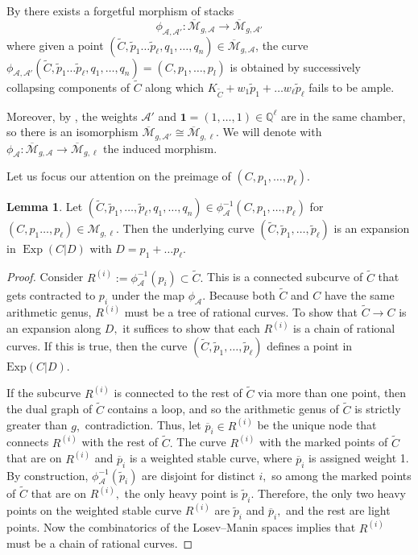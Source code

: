 \documentclass[10.5pt]{amsart}
\theoremstyle{definition}
\theoremstyle{definition}
\theoremstyle{definition}
\theoremstyle{definition}
\newtheorem{lemma}[theorem]{Lemma}
\newcommand{\Exp}{\operatorname{Exp}}
\newcommand{\ol}[1]{\overline{#1}}
\newcommand{\Mcal}{\mathcal{M}}
\newcommand{\Mbar}{\ol{\Mcal}}
\newcommand{\M}{\mathcal{M}}
\newcommand{\ra}{\rightarrow}
\newcommand{\cA}{\mathcal{A}}
\begin{document}
By \cite[Theorem 4.3]{hassett} there exists a forgetful morphism of stacks $$\phi_{\mathcal{A}, \mathcal{A}'}: \Mbar_{g,\mathcal{A}} \ra \Mbar_{g,\mathcal{A}'}$$ where given a point $(\tilde C,\tilde p_1 \dots \tilde p_\ell, q_1,\dots,q_n) \in \Mbar_{g, \cA}$, the curve $\phi_{\mathcal{A}, \mathcal{A}'}(\tilde C,\tilde p_1 \dots \tilde p_\ell, q_1,\dots,q_n)=(C, p_1,\dots,p_l)$ is obtained by successively collapsing components of $\tilde{C}$ along which $K_{\tilde C}+ w_1\tilde p_1+\dots w_\ell \tilde p_\ell$ fails to be ample.

Moreover, by \cite[Proposition 5.1]{hassett}, the weights $\mathcal{A}'$ and $\mathbf{1} = (1,\dots,1)\in \mathbb{Q}^{\ell}$ are in the same chamber, so there is an isomorphism $\Mbar_{g,\mathcal{A'}} \cong \Mbar_{g,\ell}$. We will denote with $\phi_{\mathcal{A}}: \Mbar_{g,\mathcal{A}} \ra \Mbar_{g,\ell}$ the induced morphism.

Let us focus our attention on the preimage of $(C,p_1,\dots,p_\ell)$. 

\begin{lemma}\label{lem:Aexp}
    Let $(\tilde C,\tilde p_1, \dots, \tilde p_\ell, q_1,\dots,q_n) \in \phi_{\mathcal{A}}^{-1}(C,p_1,\dots, p_\ell)$ for $(C,p_1\dots,p_\ell) \in \M_{g,\ell}$. Then the underlying curve $(\tilde C, \tilde p_1, \dots, \tilde p_\ell)$ is an expansion in $\Exp(C|D)$ with $D=p_1+\dots p_\ell$.
\end{lemma}

\begin{proof} 
Consider $R^{(i)}:=\phi_{\mathcal{A}}^{-1}(p_i)\subset \tilde{C}.$ This is a connected subcurve of $\tilde{C}$ that gets contracted to $p_i$ under the map $\phi_{\mathcal{A}}.$ Because both $\tilde{C}$ and $C$ have the same arithmetic genus, $R^{(i)}$ must be a tree of rational curves. To show that $\tilde{C}\to C$ is an expansion along $D,$ it suffices to show that each $R^{(i)}$ is a chain of rational curves. If this is true, then the curve $(\tilde{C},\tilde{p}_1,\dots,\tilde{p}_\ell)$ defines a point in $\mathrm{Exp}(C|D).$

If the subcurve $R^{(i)}$ is connected to the rest of $\tilde{C}$ via more than one point, then the dual graph of $\tilde{C}$ contains a loop, and so the arithmetic genus of $\tilde{C}$ is strictly greater than $g,$ contradiction. Thus, let $\overline{p}_i\in R^{(i)}$ be the unique node that connects $R^{(i)}$ with the rest of $\tilde{C}.$ The curve $R^{(i)}$ with the marked points of $\tilde{C}$ that are on $R^{(i)}$ and $\overline{p}_i$ is a weighted stable curve, where $\overline{p}_i$ is assigned weight 1. By construction, $\phi_{\mathcal{A}}^{-1}(\tilde{p}_i)$ are disjoint for distinct $i,$ so among the marked points of $\tilde{C}$ that are on $R^{(i)},$ the only heavy point is $\tilde{p}_i.$ Therefore, the only two heavy points on the weighted stable curve $R^{(i)}$ are $\tilde{p}_i$ and $\overline{p}_i,$ and the rest are light points. Now the combinatorics of the Losev--Manin spaces implies that $R^{(i)}$ must be a chain of rational curves.
\end{proof}
\end{document}
